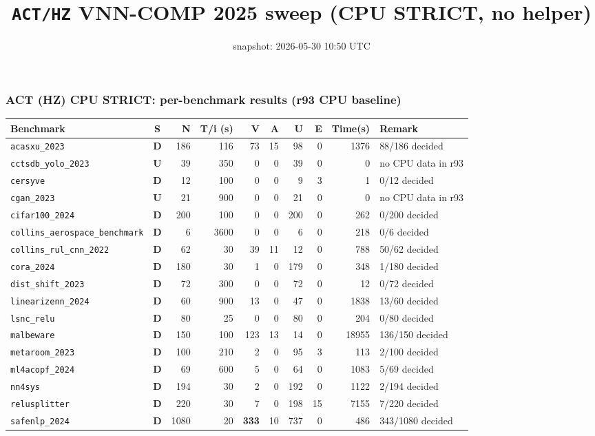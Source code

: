 \documentclass[10pt]{beamer}
\title{\large \texttt{ACT/HZ} VNN-COMP 2025 sweep (CPU STRICT, no helper)}
\date{snapshot: 2026-05-30 10:50 UTC}
\newcommand{\sdone}{{\color{cdone}\textbf{D}}}
\newcommand{\sunsup}{{\color{cunsup}\textbf{U}}}
\begin{document}
\begin{frame}[fragile]
\frametitle{ACT (HZ) CPU STRICT: per-benchmark results (r93 CPU baseline)}
\centering\tiny
\setlength{\tabcolsep}{3pt}
\begin{tabular}{l c r r r r r r r l}
\toprule
\textbf{Benchmark} & \textbf{S} & \textbf{N} & \textbf{T/i (s)} & \textbf{V} & \textbf{A} & \textbf{U} & \textbf{E} & \textbf{Time(s)} & \textbf{Remark} \\
\midrule
  \texttt{acasxu\_2023} & \sdone & 186 & 116 & 73 & 15 & 98 & 0 & 1376 & 88/186 decided \\
  \texttt{cctsdb\_yolo\_2023} & \sunsup & 39 & 350 & 0 & 0 & 39 & 0 & 0 & no CPU data in r93 \\
  \texttt{cersyve} & \sdone & 12 & 100 & 0 & 0 & 9 & 3 & 1 & 0/12 decided \\
  \texttt{cgan\_2023} & \sunsup & 21 & 900 & 0 & 0 & 21 & 0 & 0 & no CPU data in r93 \\
  \texttt{cifar100\_2024} & \sdone & 200 & 100 & 0 & 0 & 200 & 0 & 262 & 0/200 decided \\
  \texttt{collins\_aerospace\_benchmark} & \sdone & 6 & 3600 & 0 & 0 & 6 & 0 & 218 & 0/6 decided \\
  \texttt{collins\_rul\_cnn\_2022} & \sdone & 62 & 30 & 39 & 11 & 12 & 0 & 788 & 50/62 decided \\
  \texttt{cora\_2024} & \sdone & 180 & 30 & 1 & 0 & 179 & 0 & 348 & 1/180 decided \\
  \texttt{dist\_shift\_2023} & \sdone & 72 & 300 & 0 & 0 & 72 & 0 & 12 & 0/72 decided \\
  \texttt{linearizenn\_2024} & \sdone & 60 & 900 & 13 & 0 & 47 & 0 & 1838 & 13/60 decided \\
  \texttt{lsnc\_relu} & \sdone & 80 & 25 & 0 & 0 & 80 & 0 & 204 & 0/80 decided \\
  \texttt{malbeware} & \sdone & 150 & 100 & 123 & 13 & 14 & 0 & 18955 & 136/150 decided \\
  \texttt{metaroom\_2023} & \sdone & 100 & 210 & 2 & 0 & 95 & 3 & 113 & 2/100 decided \\
  \texttt{ml4acopf\_2024} & \sdone & 69 & 600 & 5 & 0 & 64 & 0 & 1083 & 5/69 decided \\
  \texttt{nn4sys} & \sdone & 194 & 30 & 2 & 0 & 192 & 0 & 1122 & 2/194 decided \\
  \texttt{relusplitter} & \sdone & 220 & 30 & 7 & 0 & 198 & 15 & 7155 & 7/220 decided \\
  \texttt{safenlp\_2024} & \sdone & 1080 & 20 & \textbf{333} & 10 & 737 & 0 & 486 & 343/1080 decided \\

\end{tabular}
\end{frame}
\end{document}

